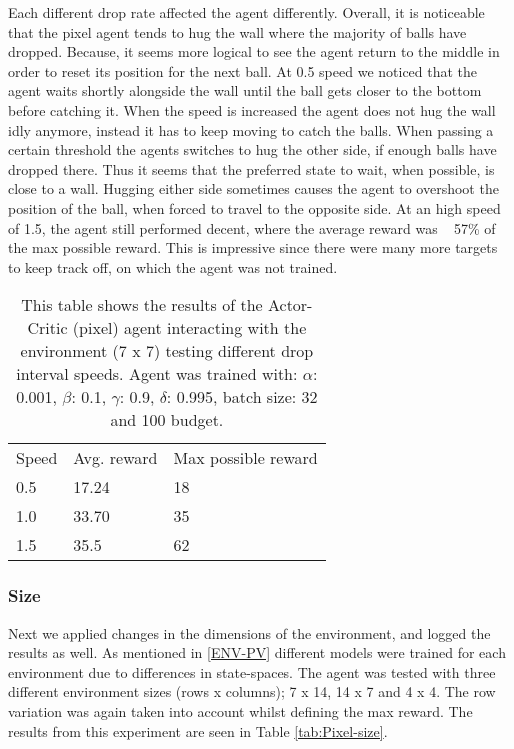 \documentclass{article}
\begin{document}
    Each different drop rate affected the agent differently. 
    Overall, it is noticeable that the pixel agent tends to hug the wall where the majority of balls have dropped.
    Because, it seems more logical to see the agent return to the middle in order to reset its position for the next ball.
    At 0.5 speed we noticed that the agent waits shortly alongside the wall until the ball gets closer to the bottom before catching it. 
    When the speed is increased the agent does not hug the wall idly anymore, instead it has to keep moving to catch the balls. 
    When passing a certain threshold the agents switches to hug the other side, if enough balls have dropped there. 
    Thus it seems that the preferred state to wait, when possible, is close to a wall. 
    Hugging either side sometimes causes the agent to overshoot the position of the ball, when forced to travel to the opposite side. 
    At an high speed of 1.5, the agent still performed decent, where the average reward was ~ 57\% of the max possible reward. 
    This is impressive since there were many more targets to keep track off, on which the agent was not trained. 
    
    \begin{table}[]
    \begin{tabular}{lll}
    Speed & Avg. reward & Max possible reward \\
    0.5   & 17.24       & 18                  \\
    1.0   & 33.70       & 35                  \\
    1.5   & 35.5        & 62                 
    \end{tabular}
    \caption{This table shows the results of the Actor-Critic (pixel) agent interacting with the environment (7 x 7) testing different drop interval speeds.  Agent was trained with: $\alpha$: 0.001, $\beta$: 0.1, $\gamma$: 0.9, $\delta$: 0.995, batch size: 32 and 100 budget. }
    \label{tab:Pixel-speed}
    \end{table}
    
    \subsubsection{Size}
    Next we applied changes in the dimensions of the environment, and logged the results as well.
    As mentioned in \ref{ENV-PV} different models were trained for each environment due to differences in state-spaces. 
    The agent was tested with three different environment sizes (rows x columns); 7 x 14, 14 x 7 and 4 x 4. 
    The row variation was again taken into account whilst defining the max reward. 
    The results from this experiment are seen in Table \ref{tab:Pixel-size}.
    
\end{document}
